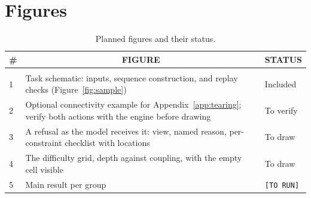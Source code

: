 \section{Figures}
\label{sec:figures}

\begin{table}[h]
\caption{Planned figures and their status.}
\label{tab:figures}
\begin{center}
\begin{tabular}{lp{}l}
\multicolumn{1}{c}{\bf \#}  &\multicolumn{1}{c}{\bf FIGURE}  &\multicolumn{1}{c}{\bf STATUS} \\
\hline \\
1 & Task schematic: inputs, sequence construction, and replay checks
    (Figure~\ref{fig:sample}) & Included \\
2 & Optional connectivity example for Appendix~\ref{app:tearing}; verify both actions
    with the engine before drawing & To verify \\
3 & A refusal as the model receives it: view, named reason, per-constraint checklist with
    locations & To draw \\
4 & The difficulty grid, depth against coupling, with the empty cell visible & To draw \\
5 & Main result per group & \texttt{[TO RUN]} \\
\end{tabular}
\end{center}
\end{table}
